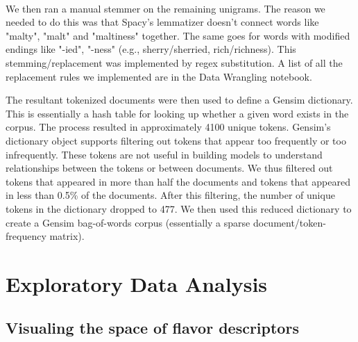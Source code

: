 \documentclass{article}
\begin{document}
 	 \paragraph{} We then ran a manual stemmer on the remaining unigrams. The reason we needed to do this was that Spacy's lemmatizer doesn't connect words like "malty", "malt" and "maltiness" together. The same goes for words with modified endings like "-ied", "-ness" (e.g., sherry/sherried, rich/richness). This stemming/replacement was implemented by regex substitution. A list of all the replacement rules we implemented are in the Data Wrangling notebook. 
 	 
 	 The resultant tokenized documents were then used to define a Gensim dictionary. This is essentially a hash table for looking up whether a given word exists in the corpus. The process resulted in approximately 4100 unique tokens. Gensim's dictionary object supports filtering out tokens that appear too frequently or too infrequently. These tokens are not useful in building models to understand relationships between the tokens or between documents. We thus filtered out tokens that appeared in more than half the documents and tokens that appeared in less than 0.5\% of the documents. After this filtering, the number of unique tokens in the dictionary dropped to 477. We then used this reduced dictionary to create a Gensim bag-of-words corpus (essentially a sparse document/token-frequency matrix).
 	 \section{Exploratory Data Analysis}
 	 \subsection{Visualing the space of flavor descriptors}
\end{document}
